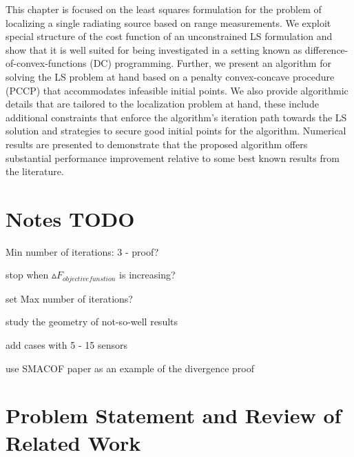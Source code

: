 \label{chapter:pccp}



This chapter is focused on the least squares formulation for the problem of localizing a single radiating source based on range measurements.   We exploit special structure of the cost function of an unconstrained LS formulation and show that it is well suited for being investigated in a setting known as difference-of-convex-functions (DC) programming. Further, we present an algorithm for solving the LS problem at hand based on a penalty convex-concave procedure (PCCP) \cite{LBoyd} that accommodates infeasible initial points. We also provide algorithmic details that are tailored to the localization problem at hand, these include additional constraints that enforce the algorithm’s  iteration path towards the LS solution and strategies to secure good initial points for the algorithm. Numerical results are presented to demonstrate that the proposed algorithm offers substantial performance improvement relative to some best known results from the literature.

\section{Notes TODO}

Min number of iterations: 3 - proof?

stop when $\vartriangle F_{objective funstion}$ is increasing?

set Max number of iterations?

study the geometry of not-so-well results

add cases with 5 - 15 sensors

use SMACOF paper as an example of the divergence proof

\phantom{m}

\section{Problem Statement and Review of Related Work}%

